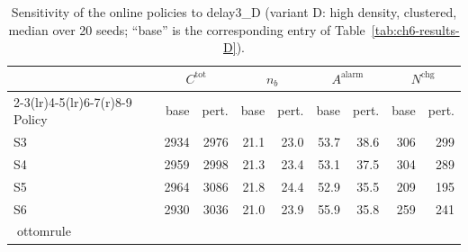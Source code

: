 \begin{table}[htbp]
\centering
\caption{Sensitivity of the online policies to delay3_D (variant D: high density, clustered,
median over 20 seeds; ``base'' is the corresponding entry of
Table~\ref{tab:ch6-results-D}).}
\label{tab:ch6-sens-D-delay3}
\footnotesize
\begin{tabular}{@{}l rr rr rr rr@{}}
\toprule
& \multicolumn{2}{c}{$C^{\mathrm{tot}}$} & \multicolumn{2}{c}{$n_b$}
  & \multicolumn{2}{c}{$A^{\mathrm{alarm}}$} & \multicolumn{2}{c}{$N^{\mathrm{chg}}$} \\
\cmidrule(r){2-3}\cmidrule(lr){4-5}\cmidrule(lr){6-7}\cmidrule(r){8-9}
Policy & base & pert. & base & pert. & base & pert. & base & pert. \\
\midrule

S3 & 2934 & 2976 & 21.1 & 23.0 & 53.7 & 38.6 & 306 & 299 \\
S4 & 2959 & 2998 & 21.3 & 23.4 & 53.1 & 37.5 & 304 & 289 \\
S5 & 2964 & 3086 & 21.8 & 24.4 & 52.9 & 35.5 & 209 & 195 \\
S6 & 2930 & 3036 & 21.0 & 23.9 & 55.9 & 35.8 & 259 & 241 \\
ottomrule
\end{tabular}
\end{table}
